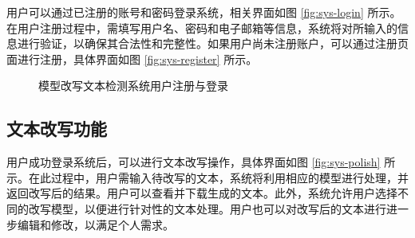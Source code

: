 用户可以通过已注册的账号和密码登录系统，相关界面如图 \ref{fig:sys-login} 所示。在用户注册过程中，需填写用户名、密码和电子邮箱等信息，系统将对所输入的信息进行验证，以确保其合法性和完整性。如果用户尚未注册账户，可以通过注册页面进行注册，具体界面如图 \ref{fig:sys-register} 所示。

\begin{figure}[htb]
    \hfill
    \caption{模型改写文本检测系统用户注册与登录}
    \label{fig:sys-login-register}
\end{figure}

\subsection{文本改写功能}

用户成功登录系统后，可以进行文本改写操作，具体界面如图 \ref{fig:sys-polish} 所示。在此过程中，用户需输入待改写的文本，系统将利用相应的模型进行处理，并返回改写后的结果。用户可以查看并下载生成的文本。此外，系统允许用户选择不同的改写模型，以便进行针对性的文本处理。用户也可以对改写后的文本进行进一步编辑和修改，以满足个人需求。

